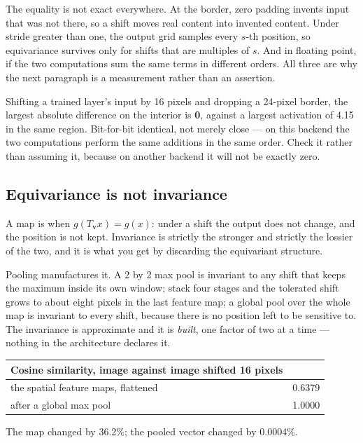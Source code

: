 \documentclass[11pt,a4paper]{article}
\begin{document}
The equality is not exact everywhere. At the border, zero padding invents input
that was not there, so a shift moves real content into invented content. Under
stride greater than one, the output grid samples every $s$-th position, so
equivariance survives only for shifts that are multiples of $s$. And in
floating point, if the two computations sum the same terms in different orders.
All three are why the next paragraph is a measurement rather than an assertion.

Shifting a trained layer's input by 16 pixels and dropping a 24-pixel border,
the largest absolute difference on the interior is \textbf{0}, against a
largest activation of 4.15 in the same region. Bit-for-bit identical, not
merely close --- on this backend the two computations perform the same
additions in the same order. Check it rather than assuming it, because on
another backend it will not be exactly zero.

\subsection{Equivariance is not invariance}

A map is  when $g(T_{\mathbf{v}}x) = g(x)$: under a shift the
output does not change, and the position is not kept. Invariance is strictly
the stronger and strictly the lossier of the two, and it is what you get by
discarding the equivariant structure.

Pooling manufactures it. A 2 by 2 max pool is invariant to any shift that keeps
the maximum inside its own window; stack four stages and the tolerated shift
grows to about eight pixels in the last feature map; a global pool over the
whole map is invariant to every shift, because there is no position left to be
sensitive to. The invariance is approximate and it is \emph{built}, one factor
of two at a time --- nothing in the architecture declares it.

\begin{center}
\small
\begin{tabular}{lr}
\toprule
\textbf{Cosine similarity, image against image shifted 16 pixels} & \\
\midrule
the spatial feature maps, flattened & 0.6379 \\
after a global max pool & 1.0000 \\
\bottomrule
\end{tabular}
\end{center}

The map changed by 36.2\%; the pooled vector changed by 0.0004\%.
\end{document}
